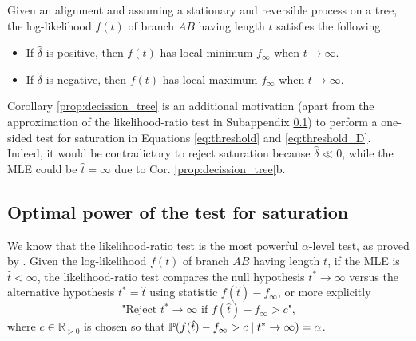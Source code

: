 \begin{appendices}
\begin{cor} \label{prop:decission_tree}
\begin{sloppypar}
Given an alignment and assuming a stationary and reversible process on a tree, the log-likelihood $f(t)$ of branch $AB$ having length $t$ satisfies the following.

\end{sloppypar}
\begin{itemize}
    \item[a)] If $\hat{\delta}$ is positive, then $f(t)$ has local minimum $f_\infty$ when $t \to \infty$.
    \item[b)] If $\hat{\delta}$ is negative, then $f(t)$ has local maximum $f_\infty$ when $t \to \infty$.
\end{itemize}
\end{cor}
Corollary \ref{prop:decission_tree} is an additional motivation (apart from the approximation of the likelihood-ratio test in Subappendix \ref{subsec:approximation}) to perform a one-sided test for saturation in Equations \ref{eq:threshold} and \ref{eq:threshold_D}. Indeed, it would be contradictory to reject saturation because  $\hat{\delta} \ll 0$, while the MLE could be $\hat{t} = \infty$ due to Cor. \ref{prop:decission_tree}b. 

\fi

 
 \subsection{Optimal power of the test for saturation}
\label{subsec:approximation}
We know that the likelihood-ratio test is the most powerful $\alpha$-level test, as proved by . 
Given the log-likelihood $f(t)$ of branch $AB$ having length $t$, if the MLE is $\hat{t} < \infty$, the likelihood-ratio test compares the null hypothesis $t^* \to \infty$ versus the alternative hypothesis $t^* = \hat{t}$  using statistic $f(\hat{t})-f_\infty$, or more explicitly
\begin{equation}
    \text{"Reject $t^* \to \infty$ if $f(\hat{t})-f_\infty > c$",}
\end{equation}
 where $c \in \mathbb{R}_{>0}$ is chosen so that $\mathbb{P}(f(\hat{t})-f_\infty > c  \mid  t^* \to \infty) = \alpha$.



\end{appendices}
